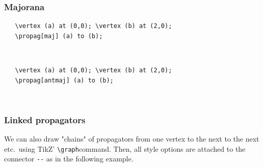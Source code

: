 \documentclass[10pt,letterpaper,twoside,notitlepage]{article}
\numberwithin{figure}{section}
\begin{document}
\subsubsection*{Majorana}
%
\begin{minipage}{0.7\linewidth}
\vercol\begin{verbatim}
   \vertex (a) at (0,0); \vertex (b) at (2,0);
   \propag[maj] (a) to (b);
\end{verbatim}\txcol
\end{minipage}
%
\begin{minipage}{0.25\linewidth}
\end{minipage}
\\
%
\begin{minipage}{0.7\linewidth}
\vercol\begin{verbatim}
   \vertex (a) at (0,0); \vertex (b) at (2,0);
   \propag[antmaj] (a) to (b);
\end{verbatim}\txcol
\end{minipage}
%
\begin{minipage}{0.25\linewidth}
\end{minipage}
\\
%
\subsubsection*{Linked propagators}
%
\noindent
We can also draw "chains" of propagators from one vertex to the next to the next etc.~using
TikZ' \blucol\verb$\graph$\txcol command. 
Then, all style options are attached to the connector \blucol\verb$--$\txcol 
as in the following example. 
\\
\end{document}
